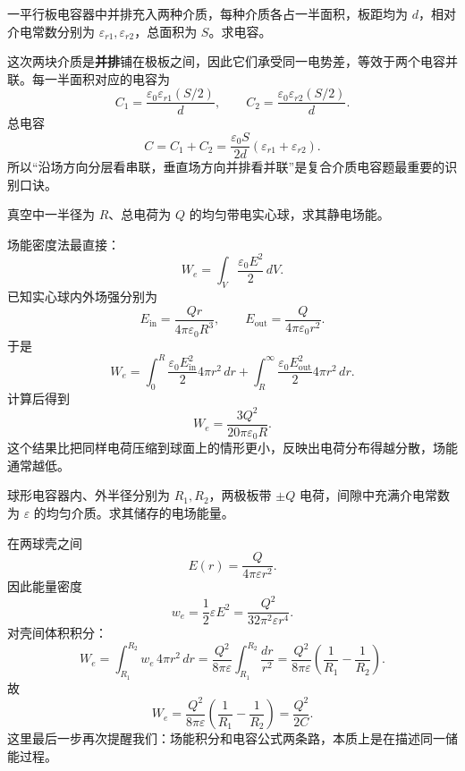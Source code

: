 \documentclass[lang=cn,11pt]{elegantbook}
\begin{document}
\begin{example}[并排充入两种介质的平行板电容器]
一平行板电容器中并排充入两种介质，每种介质各占一半面积，板距均为 \(d\)，相对介电常数分别为 \(\varepsilon_{r1},\varepsilon_{r2}\)，总面积为 \(S\)。求电容。
\end{example}

\begin{solution}
这次两块介质是\textbf{并排}铺在极板之间，因此它们承受同一电势差，等效于两个电容并联。每一半面积对应的电容为
\[
C_1=\frac{\varepsilon_0\varepsilon_{r1}(S/2)}{d},
\qquad
C_2=\frac{\varepsilon_0\varepsilon_{r2}(S/2)}{d}.
\]
总电容
\[
\boxed{
C=C_1+C_2
=\frac{\varepsilon_0S}{2d}\left(\varepsilon_{r1}+\varepsilon_{r2}\right).
}
\]
所以“沿场方向分层看串联，垂直场方向并排看并联”是复合介质电容题最重要的识别口诀。
\end{solution}

\begin{example}[均匀带电实心球的静电场能]
真空中一半径为 \(R\)、总电荷为 \(Q\) 的均匀带电实心球，求其静电场能。
\end{example}

\begin{solution}
场能密度法最直接：
\[
W_e=\int_V \frac{\varepsilon_0E^2}{2}\,dV.
\]
已知实心球内外场强分别为
\[
E_{\mathrm{in}}=\frac{Qr}{4\pi\varepsilon_0R^3},
\qquad
E_{\mathrm{out}}=\frac{Q}{4\pi\varepsilon_0r^2}.
\]
于是
\[
W_e
=\int_0^R \frac{\varepsilon_0E_{\mathrm{in}}^2}{2}4\pi r^2\,dr
+\int_R^\infty \frac{\varepsilon_0E_{\mathrm{out}}^2}{2}4\pi r^2\,dr.
\]
计算后得到
\[
\boxed{
W_e=\frac{3Q^2}{20\pi\varepsilon_0R}
}.
\]
这个结果比把同样电荷压缩到球面上的情形更小，反映出电荷分布得越分散，场能通常越低。
\end{solution}

\begin{example}[球形电容器的场能]
球形电容器内、外半径分别为 \(R_1,R_2\)，两极板带 \(\pm Q\) 电荷，间隙中充满介电常数为 \(\varepsilon\) 的均匀介质。求其储存的电场能量。
\end{example}

\begin{solution}
在两球壳之间
\[
E(r)=\frac{Q}{4\pi\varepsilon r^2}.
\]
因此能量密度
\[
w_e=\frac12 \varepsilon E^2
=\frac{Q^2}{32\pi^2\varepsilon r^4}.
\]
对壳间体积积分：
\[
W_e=\int_{R_1}^{R_2} w_e\,4\pi r^2\,dr
=\frac{Q^2}{8\pi\varepsilon}\int_{R_1}^{R_2}\frac{dr}{r^2}
=\frac{Q^2}{8\pi\varepsilon}\left(\frac{1}{R_1}-\frac{1}{R_2}\right).
\]
故
\[
\boxed{
W_e=\frac{Q^2}{8\pi\varepsilon}\left(\frac{1}{R_1}-\frac{1}{R_2}\right)
=\frac{Q^2}{2C}.
}
\]
这里最后一步再次提醒我们：场能积分和电容公式两条路，本质上是在描述同一储能过程。
\end{solution}
\end{document}
